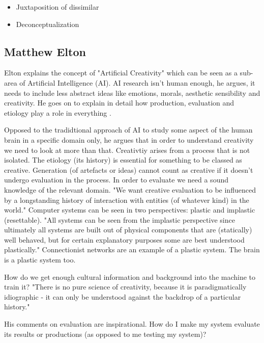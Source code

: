 \begin{itemize}
  \item Juxtaposition of dissimilar
  \item Deconceptualization
\end{itemize}

\subsection{Matthew Elton}

Elton explains the concept of "Artificial Creativity" which can be seen as a sub-area of Artificial Intelligence (AI). AI research isn't human enough, he argues, it needs to include less abstract ideas like emotions, morals, aesthetic sensibility and creativity. He goes on to explain in detail how production, evaluation and etiology play a role in everything \citep{Elton1995}.

Opposed to the tradidtional approach of AI to study  some aspect of the human brain in a specific domain only, he argues that in order to understand creativity we need to look at more than that. Creativtiy arises from a process that is not isolated. The etiology (its history) is essential for something to be classed as creative. Generation (of artefacts or ideas) cannot count as creative if it doesn't undergo evaluation in the process. In order to evaluate we need a sound knowledge of the relevant domain. "We want creative evaluation to be influenced by a longstanding history of interaction with entities (of whatever kind) in the world." Computer systems can be seen in two perspectives: plastic and implastic (resettable). "All systems can be seen from the implastic perspective since ultimately all systems are built out of physical components that are (statically) well behaved, but for certain explanatory purposes some are best understood plastically." Connectionist networks are an example of a plastic system. The brain is a plastic system too.

How do we get enough cultural information and background into the machine to train it? "There is no pure science of creativity, because it is paradigmatically idiographic - it can only be understood against the backdrop of a particular history."

His comments on evaluation are inspirational. How do I make my system evaluate its results or productions (as opposed to me testing my system)?
